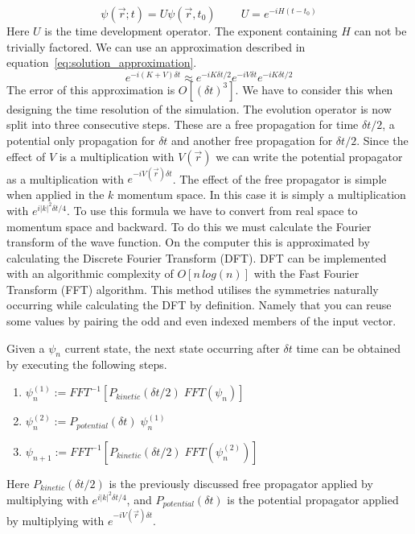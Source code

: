 \begin{equation}
	\label{eq:schrodinger_formal_solution}
	\psi(\vec{r}; t) = U\psi(\vec{r}, t_0)\;\;\;\;\;\;\;\; U = e^{-iH(t-t_0)}
\end{equation}
Here $U$ is the time development operator.
The exponent containing $H$ can not be trivially factored.
We can use an approximation described in equation~\ref{eq:solution_approximation}.
\begin{equation}
	\label{eq:solution_approximation}
	e^{-i(K + V)\delta{}t} \approx e^{-iK\delta{}t/2}e^{-iV\delta{}t}e^{-iK\delta{}t/2}
\end{equation}
The error of this approximation is $O\left[(\delta{}t)^3 \right]$.
We have to consider this when designing the time resolution of the simulation.
The evolution operator is now split into three consecutive steps.
These are a free propagation for time $\delta{}t / 2$, a potential only propagation for $\delta{}t$ and another free propagation for $\delta{}t / 2$.
Since the effect of $V$ is a multiplication with $V(\vec{r})$ we can write the potential propagator as a multiplication with $e^{-iV(\vec{r})\delta{}t}$.
The effect of the free propagator is simple when applied in the $k$ momentum space.
In this case it is simply a multiplication with $e^{i|k|^2\delta{}t/4}$.
To use this formula we have to convert from real space to momentum space and backward.
To do this we must calculate the Fourier transform of the wave function.
On the computer this is approximated by calculating the Discrete Fourier Transform (DFT).
DFT can be implemented with an algorithmic complexity of $O\left[n\,log(n)\right]$  with the Fast Fourier Transform (FFT) algorithm.
This method utilises the symmetries naturally occurring while calculating the DFT by definition.
Namely that you can reuse some values by pairing the odd and even indexed members of the input vector.

Given a $\psi_n$ current state, the next state occurring after $\delta{}t$ time can be obtained by executing the following steps.
\begin{enumerate}
	\item{$\psi_n^{(1)} := FFT^{-1}\left[ P_{kinetic}(\delta{}t/2)\;FFT(\psi_n) \right]$}
	\item{$\psi_n^{(2)} := P_{potential}(\delta{}t)\;\psi_n^{(1)}$}
	\item{$\psi_{n+1} := FFT^{-1}\left[ P_{kinetic}(\delta{}t/2)\;FFT(\psi_n^{(2)}) \right]$}
\end{enumerate}
Here $P_{kinetic}(\delta{}t/2)$ is the previously discussed free propagator applied by multiplying with $e^{i|k|^2\delta{}t/4}$, and $P_{potential}(\delta{}t)$ is the potential propagator applied by multiplying with $e^{-iV(\vec{r})\delta{}t}$.


